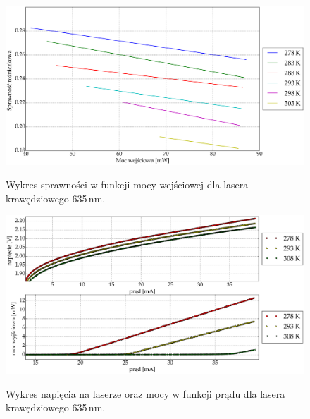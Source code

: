 \begin{figure}
\center
  \includegraphics[scale=0.30]{plot635/plot_eff_via_power.eps}
  \label{rys3}
  \caption{Wykres sprawności w funkcji mocy wejściowej dla lasera krawędziowego 635\,nm.}
\end{figure}
\begin{figure}
\center
  \includegraphics[scale=0.30]{plot635/plot_voltage_power.eps}
  \label{rys3}
  \caption{Wykres napięcia na laserze oraz mocy w funkcji prądu dla lasera krawędziowego 635\,nm.}
\end{figure}
